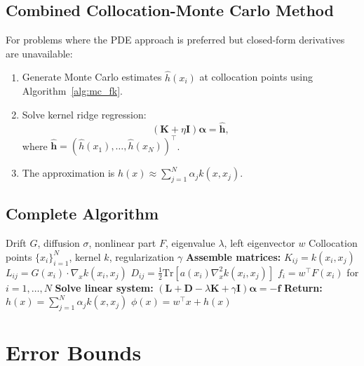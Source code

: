 \documentclass[11pt,a4paper]{article}
\newcommand{\Tr}{\mathrm{Tr}}
\newcommand{\bK}{\mathbf{K}}
\newcommand{\bL}{\mathbf{L}}
\newcommand{\bD}{\mathbf{D}}
\newcommand{\bI}{\mathbf{I}}
\begin{document}
\subsection{Combined Collocation-Monte Carlo Method}

For problems where the PDE approach is preferred but closed-form derivatives are unavailable:

\begin{enumerate}
\item Generate Monte Carlo estimates $\widehat{h}(x_i)$ at collocation points using Algorithm~\ref{alg:mc_fk}.
\item Solve kernel ridge regression:
\begin{equation}
(\bK + \eta \bI) \boldsymbol{\alpha} = \widehat{\mathbf{h}},
\end{equation}
where $\widehat{\mathbf{h}} = (\widehat{h}(x_1), \ldots, \widehat{h}(x_N))^\top$.
\item The approximation is $h(x) \approx \sum_{j=1}^N \alpha_j k(x, x_j)$.
\end{enumerate}

\subsection{Complete Algorithm}

\begin{algorithm}[H]
\caption{Stochastic Koopman Eigenfunction Computation}
\label{alg:stoch_koopman}
\begin{algorithmic}[1]
\Require Drift $G$, diffusion $\sigma$, nonlinear part $F$, eigenvalue $\lambda$, left eigenvector $w$
\Require Collocation points $\{x_i\}_{i=1}^N$, kernel $k$, regularization $\gamma$
\State \textbf{Assemble matrices:}
\State $K_{ij} = k(x_i, x_j)$
\State $L_{ij} = G(x_i) \cdot \nabla_x k(x_i, x_j)$
\State $D_{ij} = \frac{1}{2} \Tr[a(x_i) \nabla_x^2 k(x_i, x_j)]$ 
\EndFor
\State $f_i = w^\top F(x_i)$ for $i = 1, \ldots, N$
\State \textbf{Solve linear system:}
\State $(\bL + \bD - \lambda \bK + \gamma \bI) \boldsymbol{\alpha} = -\mathbf{f}$
\State \textbf{Return:}
\State $h(x) = \sum_{j=1}^N \alpha_j k(x, x_j)$
\State $\phi(x) = w^\top x + h(x)$
\end{algorithmic}
\end{algorithm}

\section{Error Bounds}\label{sec:error_bounds}
\end{document}
